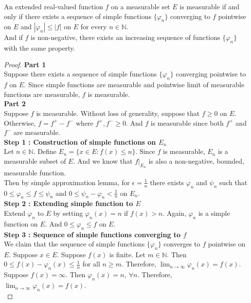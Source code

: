 \begin{theorem}
	An extended real-valued function $f$ on a measurable set $E$ is measurable if and only if there exists a sequence of simple functions $\{ \varphi_n \}$ converging to $f$ pointwise on $E$ and $|\varphi_n| \le |f|$ on $E$ for every $n \in \mathbb{N}$.\\
	And if $f$ is non-negative, there exists an increasing sequence of functions $\{ \varphi_n \}$ with the same property.
\end{theorem}
\begin{proof}
	\textbf{Part 1}\\
	Suppose there exists a sequence of simple functions $\{\varphi_n \}$ converging pointwise to $f$ on $E$.
	Since simple functions are measurable and pointwise limit of measurable functions are measurable, $f$ is measurable.\\

	\textbf{Part 2}\\	
	Suppose $f$ is measurable.
	Without loss of generality, suppose that $f \ge 0$ on $E$.
	Otherwise, $f = f^+ - f^-$ where $f^+,f^- \ge 0$.
	And $f$ is measurable since both $f^+$ and $f^-$ are measurable.\\

	\textbf{Step 1 : Construction of simple functions on $E_n$}\\
	Let $n \in \mathbb{N}$.
	Define $E_n = \{ x \in E : f(x) \le n \}$.
	Since $f$ is measurable, $E_n$ is a measurable subset of $E$.
	And we know that $f|_{E_n}$ is also a non-negative, bounded, measurable function.\\

	Then by simple approximation lemma, for $\epsilon = \frac{1}{n}$ there exists $\varphi_n$ and $\psi_n$ such that $0 \le \varphi_n \le f \le \psi_n$ and $0 \le \psi_n - \varphi_n < \frac{1}{n}$ on $E_n$.\\

	\textbf{Step 2 : Extending simple function to $E$}\\
	Extend $\varphi_n$ to $E$ by setting $\varphi_n(x) = n$ if $f(x) > n$.
	Again, $\varphi_n$ is a simple function on $E$.
	And $0 \le \varphi_n \le f$ on $E$.\\

	\textbf{Step 3 : Sequence of simple functions converging to $f$}\\
	We claim that the sequence of simple functions $\{ \varphi_n \}$ converges to $f$ pointwise on $E$.
	Suppose $x \in E$.
	Suppose $f(x)$ is finite.
	Let $m \in \mathbb{N}$.
	Then $0 \le f(x) - \varphi_n(x) \le \frac{1}{n}$ for all $n \ge m$.
	Therefore, $\displaystyle \lim_{n \to \infty} \varphi_n(x) = f(x)$.
	Suppose $f(x) = \infty$.
	Then $\varphi_n(x) = n,\ \forall n$.
	Therefore, $\displaystyle \lim_{n \to \infty} \varphi_n(x) = f(x)$.\\


\end{proof}
